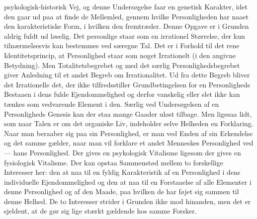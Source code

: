 \documentclass[12pt]{article}
\newcommand{\opage}[1]{\marginnote{\footnotesize\textit{[#1]}}}
\begin{document}
psykologisk-historisk Vej, og denne Undersøgelse faar en genetisk
Karakter, idet den gaar ud paa at finde de Mellemled, gennem hvilke
Personligheden har naaet den karakteristiske Form, i hvilken den
fremtræder. Denne Opgave er i Grunden aldrig fuldt ud løselig. Det
personlige staar som en irrationel Størrelse, der kun tilnærmelsesvis
kan bestemmes ved særegne Tal. Det er i Forhold til det rene
Identitetsprincip, at Personlighed staar som noget Irrationelt (i den
angivne Betydning). Men Totalitetsbegrebet og med det særlig
Personlighedsbegrebet giver Anledning til et andet Begreb om
Irrationalitet. Ud fra dette Begreb bliver det Irrationelle det, der
ikke tilfredsstiller Grundbetingelsen for en Personligheds Bestaaen i
dens fulde Ejendommelighed og derfor vanskelig eller slet ikke kan
tænkes som vedvarende Element i den. Særlig ved Undersøgelsen af en
Personligheds Genesis kan der staa mange Gaader uløst tilbage. Men
ligesaa lidt, som naar Talen er om det organiske Liv, indeholder selve
Helheden en Forklaring. Naar man beraaber sig paa sin Personlighed, er
man ved Enden af sin Erkendelse og det samme gælder, naar man vil
forklare et andet Menneskes Personlighed ved --- hans Personlighed. Der
gives en psykologisk Vitalisme ligesom der gives en fysiologisk
Vitalisme. Der kan
\setcounter{footnote}{0}%
\opage{44}opstaa Sammenstød mellem to forskellige Interesser her: den at
naa til en fyldig Karakteristik af en Personlighed i dens individuelle
Ejendommelighed og den at naa til en Forstaaelse af alle Elementer i
denne Personlighed og af den Maade, paa hvilken de har føjet sig
sammen til denne Helhed. De to Interesser strider i Grunden ikke mod
hinanden, men det er sjeldent, at de gør sig lige stærkt gældende hos
samme Forsker.
\end{document}
